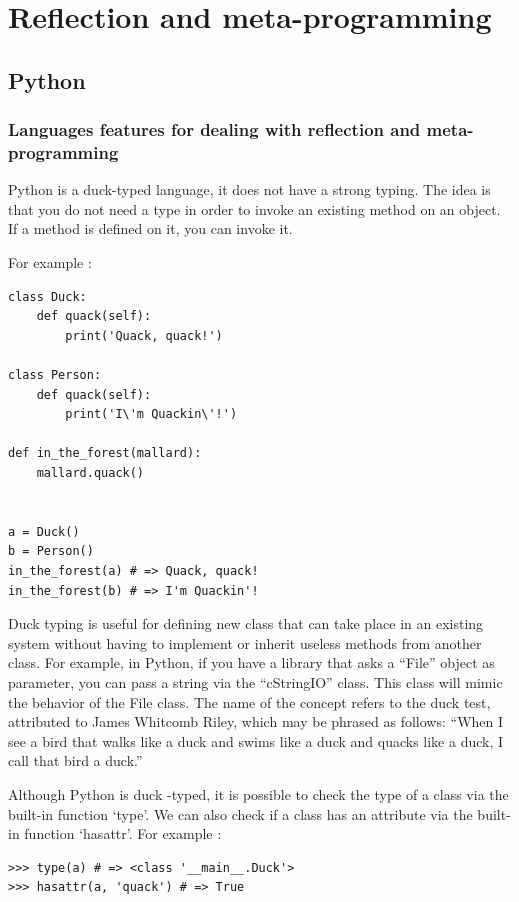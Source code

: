 \documentclass[a4paper,10pt]{article}
\begin{document}
\section{Reflection and meta-programming}

\subsection{Python}
\setpy{}
\subsubsection{Languages features for dealing with reflection and meta-programming}
\setpy{}
Python is a duck-typed language, it does not have a strong typing. The idea is that you do not need a type in order to invoke an existing method on an object. If a method is defined on it, you can invoke it.

For example :

\begin{lstlisting}
class Duck:
    def quack(self):
        print('Quack, quack!')

class Person:
    def quack(self):
        print('I\'m Quackin\'!')

def in_the_forest(mallard):
    mallard.quack()


a = Duck()
b = Person()
in_the_forest(a) # => Quack, quack!
in_the_forest(b) # => I'm Quackin'!
\end{lstlisting}

Duck typing is useful for defining new class that can take place in an existing system without having to implement or inherit useless methods from another class. For example, in Python, if you have a library that asks a “File” object as parameter, you can pass a string via the  “cStringIO” class. This class will mimic the behavior of the File class. The name of the concept refers to the duck test, attributed to James Whitcomb Riley, which may be phrased as follows: “When I see a bird that walks like a duck and swims like a duck and quacks like a duck, I call that bird a duck.”

Although Python is duck -typed, it is possible to check the type of a class via the built-in function ‘type’. We can also check if a class has an attribute via the built-in function ‘hasattr’. For example :

\begin{lstlisting}
>>> type(a) # => <class '__main__.Duck'>
>>> hasattr(a, 'quack') # => True
\end{lstlisting}
\end{document}
